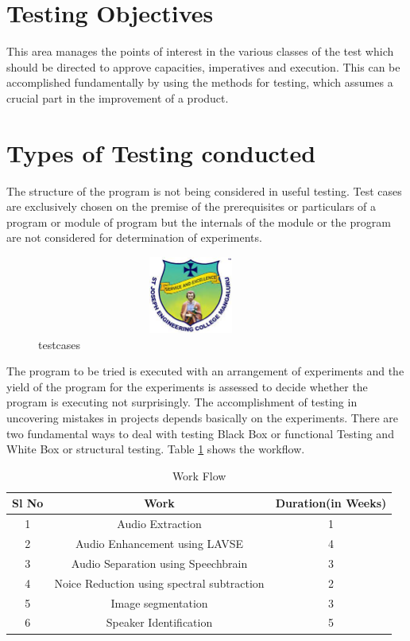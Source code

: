 \documentclass[12pt,a4paper]{report}
\begin{document}
\section{Testing Objectives}
This area manages the points of interest in the various classes of the test which should be
directed to approve capacities, imperatives and execution. This can be accomplished
fundamentally by using the methods for testing, which assumes a crucial part in the
improvement of a product.

\section{Types of Testing conducted}
The structure of the program is not being considered in useful testing. Test cases are
exclusively chosen on the premise of the prerequisites or particulars of a program or
module of program but the internals of the module or the program are not considered for
determination of experiments\cite{ref1}.

\begin{figure}[h!]
\centering
\includegraphics[width=4in,height=1in]{pic/sjeclogo.png}
\caption{testcases}
\label{fig:pic4}
\end{figure}
The program to be tried is executed with an arrangement of experiments and the yield of
the program for the experiments is assessed to decide whether the program is executing
not surprisingly. The accomplishment of testing in uncovering mistakes in projects
depends basically on the experiments. There are two fundamental ways to deal with
testing Black Box or functional Testing and White Box or structural testing. Table \ref{tab:t1} shows the workflow. 
\begin{table} [htb]
\caption {Work Flow}
\vspace{0.25in}
\begin{tabular}{|c|c|c|}\hline
\textbf{Sl No}& \textbf{Work} & \textbf{Duration(in Weeks)}\\[6pt] \hline \normalsize
1&Audio Extraction&1 \\ \hline
2&Audio Enhancement using LAVSE&4\\ \hline
3&Audio Separation using Speechbrain&3\\ \hline
4&Noice Reduction using spectral subtraction&2\\ \hline
5&Image segmentation&3\\ \hline
6&Speaker Identification&5\\ \hline
\end{tabular}
\label{tab:t1}
\end{table}
\end{document}
